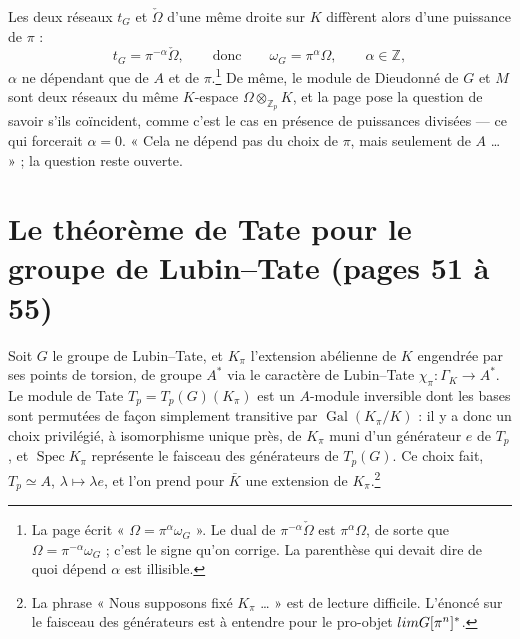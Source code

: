 \documentclass[11pt,a4paper]{article}
\begin{document}
Les deux réseaux $t_{G}$ et $\check\Omega$ d'une même droite sur $K$
diffèrent alors d'une puissance de $\pi$ :
\[
t_{G} = \pi^{-\alpha}\check\Omega, \qquad \text{donc} \qquad
\omega_{G} = \pi^{\alpha}\Omega, \qquad \alpha \in \mathbb{Z},
\]
$\alpha$ ne dépendant que de $A$ et de $\pi$.\footnote{La page écrit
« $\Omega = \pi^{\alpha}\omega_{G}$ ». Le dual de $\pi^{-\alpha}\check\Omega$
est $\pi^{\alpha}\Omega$, de sorte que $\Omega = \pi^{-\alpha}\omega_{G}$ ;
c'est le signe qu'on corrige. La parenthèse qui devait dire de quoi dépend
$\alpha$ est illisible.} De même, le module de Dieudonné de $G$ et $M$ sont
deux réseaux du même $K$-espace $\Omega \otimes_{\mathbb{Z}_{p}} K$, et la
page pose la question de savoir s'ils coïncident, comme c'est le cas en
présence de puissances divisées — ce qui forcerait $\alpha = 0$. « Cela ne
dépend pas du choix de $\pi$, mais seulement de $A$ \ldots{} » ; la question
reste ouverte.

\section*{Le théorème de Tate pour le groupe de Lubin--Tate (pages 51 à 55)}

Soit $G$ le groupe de Lubin--Tate, et $K_{\pi}$ l'extension abélienne de $K$
engendrée par ses points de torsion, de groupe $A^{*}$ via le caractère de
Lubin--Tate $\chi_{\pi}\colon \Gamma_{K} \to A^{*}$. Le module de Tate
$T_{p} = T_{p}(G)(K_{\pi})$ est un $A$-module inversible dont les bases sont
permutées de façon simplement transitive par $\operatorname{Gal}(K_{\pi}/K)$
: il y a donc un choix privilégié, à isomorphisme unique près, de $K_{\pi}$
muni d'un générateur $e$ de $T_{p}$, et $\operatorname{Spec} K_{\pi}$
représente le faisceau des générateurs de $T_{p}(G)$. Ce choix fait,
$T_{p} \simeq A$, $\lambda \mapsto \lambda e$, et l'on prend pour $\bar K$
une extension de $K_{\pi}$.\footnote{La phrase « Nous supposons fixé
$K_{\pi}$ \ldots{} » est de lecture difficile. L'énoncé sur le faisceau des
générateurs est à entendre pour le pro-objet $\varprojlim G[\pi^{n}]^{*}$.}
\end{document}
